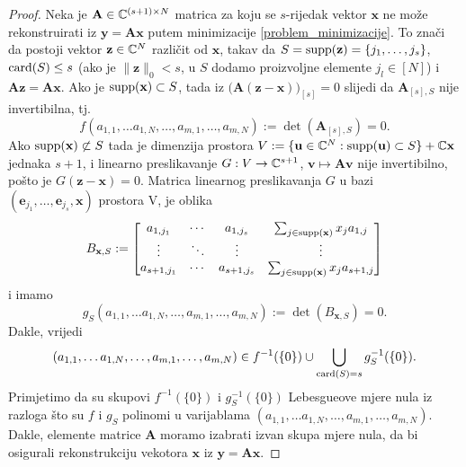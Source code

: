 \documentclass[a4paper,twoside,12pt]{memoir} %
\newcommand{\vect}[1]{\mathbf{#1}}
\renewcommand{\vec}{\vect}
\newcommand{\card}{\text{\normalfont{card}}}
\newcommand{\supp}{\text{\normalfont{supp}}}
\newcommand{\norm}[1]{\|{#1}\|}
\begin{document}
\begin{proof}
    Neka je $\vec A \in \C^{(s+1) \times N}$ matrica za koju se $s$-rijedak vektor $\vec x$ ne mo\v{z}e rekonstruirati iz $\vec y = \vec{Ax}$ putem minimizacije \eqref{problem_minimizacije}. To zna\v{c}i da postoji vektor $\vec z \in \C^N$ razli\v{c}it od $\vec x$, takav da $S=\supp(\vec z)=\{j_1, \dots, j_s\}$, $\card(S) \leq s$ (ako je $\norm{\vec z}_0 < s$, u $S$ dodamo proizvoljne elemente $j_l \in [N]$) i $\vec{Az}=\vec{Ax}$. Ako je $\supp(\vec x) \subset S$, tada iz $\big( \vec A (\vec z - \vec x)  \big)_{[s]}=0$ slijedi da $\vec A_{[s], S}$ nije invertibilna, tj.
    \begin{equation*}
        f(a_{1,1}, \dots a_{1,N}, \dots, a_{m,1}, \dots, a_{m,N}) := \det(\vec A_{[s], S}) = 0.
    \end{equation*}
    Ako $\supp(\vec x) \not\subset S$ tada je dimenzija prostora $V:=\{ \vec u \in \C^N: \supp(\vec u ) \subset S \} + \C \vec x$ jednaka $s+1$, i linearno preslikavanje $G:V \rightarrow \mathbb{C}^{s+1}$, $\vec v \mapsto \vec{Av}$ nije invertibilno, po\v{s}to je $G(\vec z - \vec x)=0$. Matrica linearnog preslikavanja $G$ u bazi $(\vec e_{j_1}, \dots, \vec e_{j_s}, \vec x)$ prostora V, je oblika
    \begin{equation*}
        B_{\vec x, S}:=
        \begin{bmatrix*}
            a_{1, j_1} & \cdots & a_{1,j_s} & \sum_{j \in \supp(\vec x)}x_j a_{1,j} \\
            \vdots & \ddots & \vdots & \vdots \\
            a_{s+1, j_1} & \cdots & a_{s+1,j_s} & \sum_{j \in \supp(\vec x)}x_j a_{s+1,j}
        \end{bmatrix*}
    \end{equation*}
    i imamo
    \begin{equation*}
        g_S(a_{1,1}, \dots a_{1,N}, \dots, a_{m,1}, \dots, a_{m,N}) := \det (B_{\vec x, S})=0.
    \end{equation*}
    Dakle, vrijedi
    \begin{equation*}
        (a_{1,1}, \dots a_{1,N}, \dots, a_{m,1}, \dots, a_{m,N}) \in f^{-1}(\{0\}) \cup \bigcup \limits_{\card(S)=s}g_S^{-1}(\{0\}).
    \end{equation*}
    Primjetimo da su skupovi $f^{-1}(\{0\})$ i $g^{-1}_S(\{0\})$ Lebesgueove mjere nula iz razloga \v{s}to su $f$ i $g_S$ polinomi u varijablama $(a_{1,1}, \dots a_{1,N}, \dots, a_{m,1}, \dots, a_{m,N})$. Dakle, elemente matrice $\vec A$ moramo izabrati izvan skupa mjere nula, da bi osigurali rekonstrukciju vekotora $\vec x$ iz $\vec y = \vec{Ax}$.
\end{proof}
\end{document}
